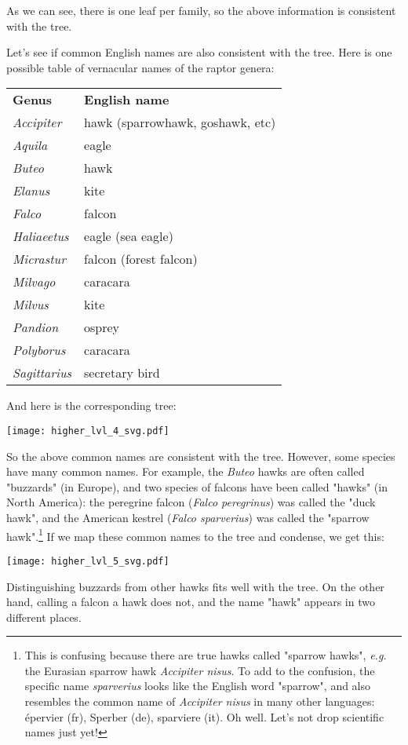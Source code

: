 \bigskip{}
\noindent{}As we can see, there is one leaf per family, so the above
information is consistent with the tree.

Let's see if common English names are also consistent with the tree. Here is
one possible table of vernacular names of the raptor genera: 

\bigskip{}
\begin{tabular}{ll}
\textbf{Genus} & \textbf{English name} \\
\textit{Accipiter} & hawk (sparrowhawk, goshawk, etc)\\
\textit{Aquila} & eagle  \\
\textit{Buteo} & hawk \\
\textit{Elanus} & kite \\
\textit{Falco} & falcon \\
\textit{Haliaeetus} & eagle (sea eagle) \\
\textit{Micrastur} & falcon (forest falcon)\\
\textit{Milvago} & caracara \\
\textit{Milvus} & kite \\
\textit{Pandion} & osprey \\
\textit{Polyborus} & caracara \\
\textit{Sagittarius} & secretary bird
\end{tabular}
\bigskip{}

And here is the corresponding tree:


\texttt{[image: higher\_lvl\_4\_svg.pdf]}
\bigskip{}

So the above common names are consistent with the tree. However, some species
have many common names. For example, the \textit{Buteo} hawks are often called
"buzzards" (in Europe), and two species of falcons have been called "hawks" (in
North America): the peregrine falcon (\textit{Falco peregrinus}) was called the
"duck hawk", and the American kestrel (\textit{Falco sparverius}) was called
the "sparrow hawk".\footnote{This is confusing because there are true hawks
called "sparrow hawks", \emph{e.g.} the Eurasian sparrow hawk \textit{Accipiter
nisus}. To add to the confusion, the specific name \textit{sparverius} looks
like the English word "sparrow", and also resembles the common name of
\textit{Accipiter nisus} in many other languages: \'{e}pervier (fr), Sperber
(de), sparviere (it). Oh well. Let's not drop scientific names just yet!} If we
map these common names to the tree and condense, we get this:


\texttt{[image: higher\_lvl\_5\_svg.pdf]}
\bigskip{}

\noindent{}Distinguishing buzzards from other hawks fits well with the tree. On
the other hand, calling a falcon a hawk does not, and the name "hawk" appears
in two different places.
